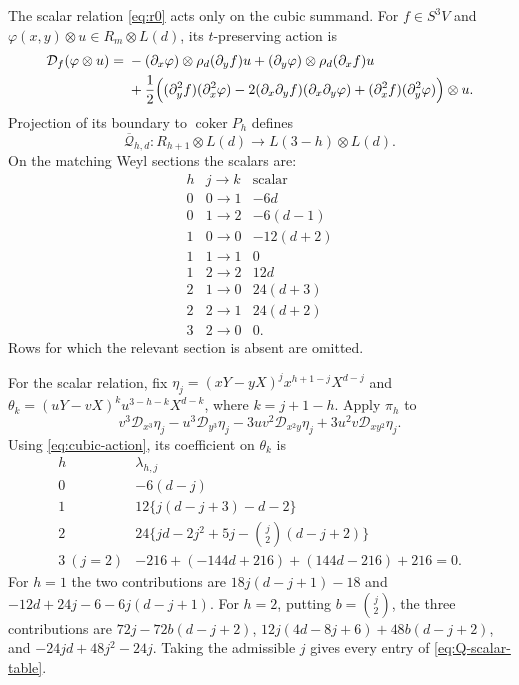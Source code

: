 \documentclass[11pt]{article}
\theoremstyle{plain}
\theoremstyle{definition}
\theoremstyle{remark}
\numberwithin{equation}{section}
\newcommand{\coker}{\operatorname{coker}}
\begin{document}
The scalar relation \eqref{eq:r0} acts only on the cubic summand.  For $f\in S^3V$ and
$\varphi(x,y)\otimes u\in R_m\otimes L(d)$, its $t$-preserving action is
\begin{equation}\label{eq:cubic-action}
\begin{aligned}
 \mathcal D_f(\varphi\otimes u)
={}&-(\partial_x\varphi)\otimes\rho_d(\partial_yf)u
 +(\partial_y\varphi)\otimes\rho_d(\partial_xf)u\\
&+\frac12\Bigl(
 (\partial_y^2f)(\partial_x^2\varphi)
 -2(\partial_x\partial_yf)(\partial_x\partial_y\varphi)
 +(\partial_x^2f)(\partial_y^2\varphi)
 \Bigr)\otimes u.
\end{aligned}
\end{equation}
Projection of its boundary to $\coker P_h$ defines
\[
 \overline{\mathcal Q}_{h,d}:R_{h+1}\otimes L(d)
 \longrightarrow L(3-h)\otimes L(d).
\]
On the matching Weyl sections the scalars are:
\begin{equation}\label{eq:Q-scalar-table}
\begin{array}{c|c|c}
 h&j\to k&\text{scalar}\\ \hline
0&0\to1&-6d\\
0&1\to2&-6(d-1)\\ \hline
1&0\to0&-12(d+2)\\
1&1\to1&0\\
1&2\to2&12d\\ \hline
2&1\to0&24(d+3)\\
2&2\to1&24(d+2)\\ \hline
3&2\to0&0.
\end{array}
\end{equation}
Rows for which the relevant section is absent are omitted.

For the scalar relation, fix $\eta_j=(xY-yX)^jx^{h+1-j}X^{d-j}$ and
$\theta_k=(uY-vX)^ku^{3-h-k}X^{d-k}$, where $k=j+1-h$.
Apply $\pi_h$ to
\[
 v^3\mathcal D_{x^3}\eta_j-u^3\mathcal D_{y^3}\eta_j
 -3uv^2\mathcal D_{x^2y}\eta_j+3u^2v\mathcal D_{xy^2}\eta_j.
\]
Using \eqref{eq:cubic-action}, its coefficient on $\theta_k$ is
\[
\begin{array}{c|c}
 h&\lambda_{h,j}\\\hline
0&-6(d-j)\\
1&12\{j(d-j+3)-d-2\}\\
2&24\{jd-2j^2+5j-\binom j2(d-j+2)\}\\
3\ (j=2)&-216+(-144d+216)+(144d-216)+216=0.
\end{array}
\]
For $h=1$ the two contributions are
$18j(d-j+1)-18$ and
$-12d+24j-6-6j(d-j+1)$.
For $h=2$, putting $b=\binom j2$, the three contributions are
$72j-72b(d-j+2)$,
$12j(4d-8j+6)+48b(d-j+2)$, and
$-24jd+48j^2-24j$.
Taking the admissible $j$ gives every entry of
\eqref{eq:Q-scalar-table}.
\end{document}
